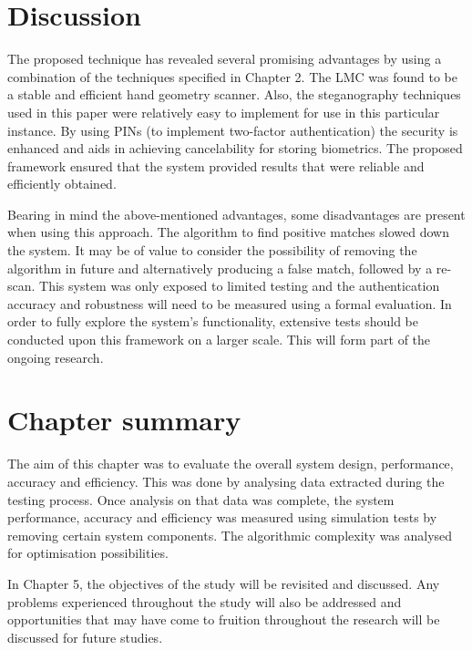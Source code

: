 \section{Discussion}

The proposed technique has revealed several promising advantages by using a combination of the techniques specified in Chapter 2. The LMC was found to be a stable and efficient hand geometry scanner. Also, the steganography techniques used in this paper were relatively easy to implement for use in this particular instance. By using PINs (to implement two-factor authentication) the security is enhanced and aids in achieving cancelability for storing biometrics. The proposed framework ensured that the system provided results that were reliable and efficiently obtained.

Bearing in mind the above-mentioned advantages, some disadvantages are present when using this approach. The algorithm to find positive matches slowed down the system. It may be of value to consider the possibility of removing the algorithm in future and alternatively producing a false match, followed by a re-scan. This system was only exposed to limited testing and the authentication accuracy and robustness will need to be measured using a formal evaluation. In order to fully explore the system’s functionality, extensive tests should be conducted upon this framework on a larger scale. This will form part of the ongoing research.


\section{Chapter summary}

The aim of this chapter was to evaluate the overall system design, performance, accuracy and efficiency. This was done by analysing data extracted during the testing process. Once analysis on that data was complete, the system performance, accuracy and efficiency was measured using simulation tests by removing certain system components. The algorithmic complexity was analysed for optimisation possibilities.

In Chapter 5, the objectives of the study will be revisited and discussed. Any problems experienced throughout the study will also be addressed and opportunities that may have come to fruition throughout the research will be discussed for future studies.